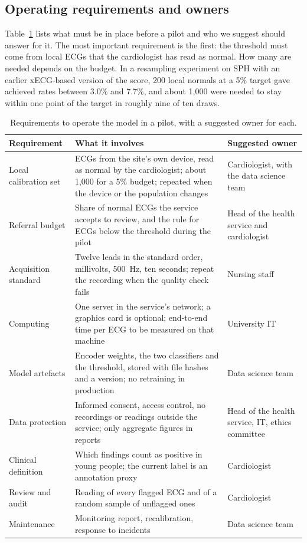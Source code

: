 \documentclass[letterpaper,11pt]{article}
\begin{document}
\subsection{Operating requirements and owners}

Table~\ref{tab:requirements} lists what must be in place before a pilot and who we suggest should answer for it. The most important requirement is the first: the threshold must come from local ECGs that the cardiologist has read as normal. How many are needed depends on the budget. In a resampling experiment on SPH with an earlier xECG-based version of the score, 200 local normals at a 5\% target gave achieved rates between 3.0\% and 7.7\%, and about 1,000 were needed to stay within one point of the target in roughly nine of ten draws.

\begin{table}[!htb]
  \centering
  \caption{Requirements to operate the model in a pilot, with a suggested owner for each.}
  \label{tab:requirements}
  \small
  \begin{tabular}{p{3.2cm}p{8.3cm}p{3.7cm}}
    \toprule
    Requirement & What it involves & Suggested owner \\
    \midrule
    Local calibration set & ECGs from the site's own device, read as normal by the cardiologist; about 1,000 for a 5\% budget; repeated when the device or the population changes & Cardiologist, with the data science team \\
    Referral budget & Share of normal ECGs the service accepts to review, and the rule for ECGs below the threshold during the pilot & Head of the health service and cardiologist \\
    Acquisition standard & Twelve leads in the standard order, millivolts, 500~Hz, ten seconds; repeat the recording when the quality check fails & Nursing staff \\
    Computing & One server in the service's network; a graphics card is optional; end-to-end time per ECG to be measured on that machine & University IT \\
    Model artefacts & Encoder weights, the two classifiers and the threshold, stored with file hashes and a version; no retraining in production & Data science team \\
    Data protection & Informed consent, access control, no recordings or readings outside the service; only aggregate figures in reports & Head of the health service, IT, ethics committee \\
    Clinical definition & Which findings count as positive in young people; the current label is an annotation proxy & Cardiologist \\
    Review and audit & Reading of every flagged ECG and of a random sample of unflagged ones & Cardiologist \\
    Maintenance & Monitoring report, recalibration, response to incidents & Data science team \\
    \bottomrule
  \end{tabular}
\end{table}
\end{document}
